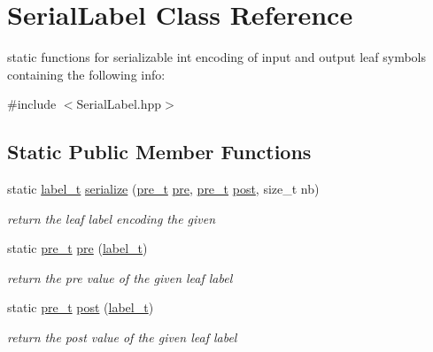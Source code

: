 \hypertarget{classSerialLabel}{}\section{Serial\+Label Class Reference}
\label{classSerialLabel}


static functions for serializable int encoding of input and output leaf symbols containing the following info\+:  




{\ttfamily \#include $<$Serial\+Label.\+hpp$>$}

\subsection*{Static Public Member Functions}
\begin{DoxyCompactItemize}
\item 
static \mbox{\hyperlink{group__output_ga22fde970e635fcf63962743b2d5c441d}{label\+\_\+t}} \mbox{\hyperlink{group__output_ga69973921641222cb765112c70df25318}{serialize}} (\mbox{\hyperlink{group__general_ga092fe8b972dfa977c2a0886720a7731e}{pre\+\_\+t}} \mbox{\hyperlink{group__output_ga3d92180f844d00eaf0bbd46e10f022e4}{pre}}, \mbox{\hyperlink{group__general_ga092fe8b972dfa977c2a0886720a7731e}{pre\+\_\+t}} \mbox{\hyperlink{group__output_ga7c5289addb03e9bf54467e2d84c7ef79}{post}}, size\+\_\+t nb)
\begin{DoxyCompactList}\small\item\em return the leaf label encoding the given \end{DoxyCompactList}\item 
static \mbox{\hyperlink{group__general_ga092fe8b972dfa977c2a0886720a7731e}{pre\+\_\+t}} \mbox{\hyperlink{group__output_ga3d92180f844d00eaf0bbd46e10f022e4}{pre}} (\mbox{\hyperlink{group__output_ga22fde970e635fcf63962743b2d5c441d}{label\+\_\+t}})
\begin{DoxyCompactList}\small\item\em return the pre value of the given leaf label \end{DoxyCompactList}\item 
static \mbox{\hyperlink{group__general_ga092fe8b972dfa977c2a0886720a7731e}{pre\+\_\+t}} \mbox{\hyperlink{group__output_ga7c5289addb03e9bf54467e2d84c7ef79}{post}} (\mbox{\hyperlink{group__output_ga22fde970e635fcf63962743b2d5c441d}{label\+\_\+t}})
\begin{DoxyCompactList}\small\item\em return the post value of the given leaf label \end{DoxyCompactList}\item 

\end{DoxyCompactItemize}
